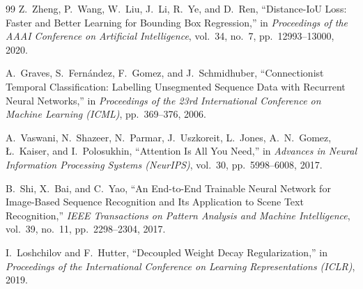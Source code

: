 \documentclass[12pt,a4paper,oneside]{report}
\begin{document}
\begin{thebibliography}{99}
Z.~Zheng, P.~Wang, W.~Liu, J.~Li, R.~Ye, and D.~Ren, ``Distance-IoU Loss: Faster and Better Learning for Bounding Box Regression,'' in \textit{Proceedings of the AAAI Conference on Artificial Intelligence}, vol.~34, no.~7, pp.~12993--13000, 2020.

A.~Graves, S.~Fern\'{a}ndez, F.~Gomez, and J.~Schmidhuber, ``Connectionist Temporal Classification: Labelling Unsegmented Sequence Data with Recurrent Neural Networks,'' in \textit{Proceedings of the 23rd International Conference on Machine Learning (ICML)}, pp.~369--376, 2006.

A.~Vaswani, N.~Shazeer, N.~Parmar, J.~Uszkoreit, L.~Jones, A.~N.~Gomez, \L.~Kaiser, and I.~Polosukhin, ``Attention Is All You Need,'' in \textit{Advances in Neural Information Processing Systems (NeurIPS)}, vol.~30, pp.~5998--6008, 2017.

B.~Shi, X.~Bai, and C.~Yao, ``An End-to-End Trainable Neural Network for Image-Based Sequence Recognition and Its Application to Scene Text Recognition,'' \textit{IEEE Transactions on Pattern Analysis and Machine Intelligence}, vol.~39, no.~11, pp.~2298--2304, 2017.

I.~Loshchilov and F.~Hutter, ``Decoupled Weight Decay Regularization,'' in \textit{Proceedings of the International Conference on Learning Representations (ICLR)}, 2019.

\end{thebibliography}
\end{document}
